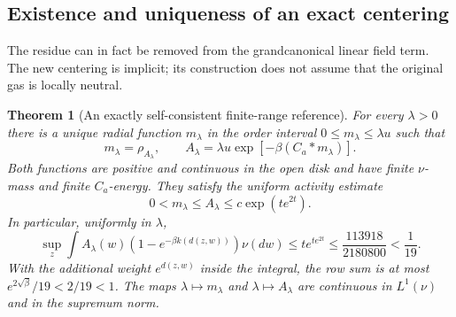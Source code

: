 \documentclass[11pt]{article}
\newtheorem{theorem}{Theorem}[section]
\theoremstyle{remark}\newtheorem{remark}[theorem]{Remark}
\begin{document}
\subsection{Existence and uniqueness of an exact centering}

The residue can in fact be removed from the grandcanonical linear
field term.  The new centering is implicit; its construction does not
assume that the original gas is locally neutral.

\begin{theorem}[An exactly self-consistent finite-range reference]
\label{thm:exact-reference-centering}
For every $\lambda>0$ there is a unique radial function
$m_\lambda$ in the order interval $0\le m_\lambda\le\lambda u$
such that
\begin{equation}\label{eq:exact-reference-centering}
 m_\lambda=\rho_{A_\lambda},\qquad
 A_\lambda=\lambda u\exp[-\beta(C_a*m_\lambda)].
\end{equation}
Both functions are positive and continuous in the open disk and have
finite $\nu$-mass and finite $C_a$-energy.  They satisfy the uniform
activity estimate
\begin{equation}\label{eq:exact-centering-activity}
 0<m_\lambda\le A_\lambda
 \le c\exp(t e^{2t}).
\end{equation}
In particular, uniformly in $\lambda$,
\begin{equation}\label{eq:exact-centering-row}
 \sup_z\int A_\lambda(w)
       (1-e^{-\beta k(d(z,w))})\nu(dw)
 \le t e^{t e^{2t}}
 \le\frac{113918}{2180800}<\frac1{19}.
\end{equation}
With the additional weight $e^{d(z,w)}$ inside the integral, the
row sum is at most $e^{2\sqrt\beta}/19<2/19<1$.
The maps $\lambda\mapsto m_\lambda$ and
$\lambda\mapsto A_\lambda$ are continuous in $L^1(\nu)$ and in
the supremum norm.
\end{theorem}
\end{document}

